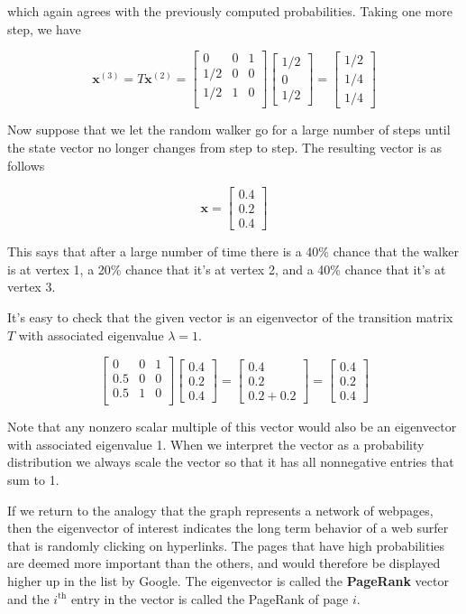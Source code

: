 \documentclass[12pt]{article}
\newcommand{\iter}[1]{^{\myp{#1}}}
\newcommand{\nin}{\noindent}
\newcommand{\vthree}{\vspace{3mm}}
\newcommand{\myp}[1]{\left( #1 \right)}
\newcommand{\ith}{i^{\textrm{th}}}
\newcommand{\mymat}[1]{
\left[
\begin{array}{rrrrrrrrrrrrrrrrrrrrrrrrrrrrrrrrrrrrrrr}
#1
\end{array}
\right]
}
\newcommand{\bx}{\mathbf{x}}
\begin{document}
\nin which again agrees with the previously computed probabilities.  Taking one more step, we have

\[
\bx\iter{3} = T\bx\iter{2} =
\mymat{
  0 & 0 & 1 \\
1/2 & 0 & 0 \\
1/2 & 1 & 0 \\
}
\mymat{1/2 \\ 0 \\ 1/2}
=
\mymat{1/2 \\ 1/4 \\ 1/4}
\]

\vthree

\nin Now suppose that we let the random walker go for a large number of steps until the state vector no longer changes from step to step.  The resulting vector is as follows

\[
\bx =
\mymat{0.4 \\ 0.2 \\ 0.4}
\]

\vthree

\nin This says that after a large number of time there is a 40\% chance that the walker is at vertex 1, a 20\% chance that it's at vertex 2, and a 40\% chance that it's at vertex 3.

\vthree

\nin It's easy to check that the given vector is an eigenvector of the transition matrix $T$ with associated eigenvalue $\lambda = 1$.

\[
\mymat{
  0 & 0 & 1 \\
0.5 & 0 & 0 \\
0.5 & 1 & 0 \\
}
\mymat{0.4 \\ 0.2 \\ 0.4}
=
\mymat{
0.4 \\
0.2 \\
0.2 + 0.2
}
= \mymat{0.4 \\ 0.2 \\ 0.4}
\]

\vthree

\nin Note that any nonzero scalar multiple of this vector would also be an eigenvector with associated eigenvalue 1.  When we interpret the vector as a probability distribution we always scale the vector so that it has all nonnegative entries that sum to 1.

\vthree

\nin If we return to the analogy that the graph represents a network of webpages, then the eigenvector of interest indicates the long term behavior of a web surfer that is randomly clicking on hyperlinks.  The pages that have high probabilities are deemed more important than the others, and would therefore be displayed higher up in the list by Google.  The eigenvector is called the {\bf PageRank} vector and the $\ith$ entry in the vector is called the PageRank of page $i$.
\end{document}
